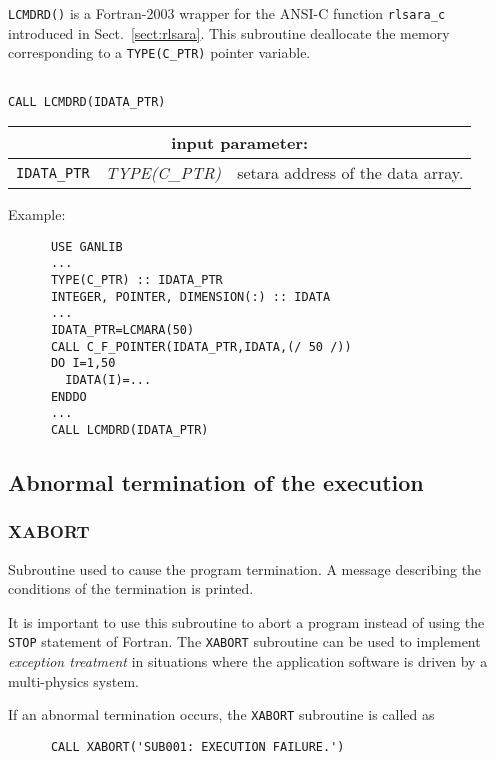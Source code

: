 {\tt LCMDRD()} is a Fortran-2003 wrapper for the ANSI-C function {\tt rlsara\_c} introduced in Sect.~\ref{sect:rlsara}. This subroutine
deallocate the memory corresponding to a {\tt TYPE(C\_PTR)} pointer variable.

\begin{verbatim}

CALL LCMDRD(IDATA_PTR)
\end{verbatim}

\noindent
\begin{tabular}{|p{1.5cm}|p{3cm}|p{10cm}|}
\hline
\multicolumn{3}{|c|}{\bf input parameter:} \\
\hline
{\tt IDATA\_PTR} & {\it TYPE(C\_PTR)} & setara address of the data array. \\
\hline
\end{tabular}

\vskip 0.4cm

\noindent Example:
\begin{verbatim}
      USE GANLIB
      ...
      TYPE(C_PTR) :: IDATA_PTR
      INTEGER, POINTER, DIMENSION(:) :: IDATA
      ...
      IDATA_PTR=LCMARA(50)
      CALL C_F_POINTER(IDATA_PTR,IDATA,(/ 50 /))
      DO I=1,50
        IDATA(I)=...
      ENDDO
      ...
      CALL LCMDRD(IDATA_PTR)
\end{verbatim}

\subsection{Abnormal termination of the execution}

\subsubsection{XABORT}

Subroutine used to cause the program termination. A message describing the conditions of the
termination is printed.

\vskip 0.2cm

It is important to use this subroutine to abort a program instead of using the {\tt STOP}
statement of Fortran. The {\tt XABORT} subroutine can be used to implement {\sl exception
treatment} in situations where the application software is driven by a multi-physics system.

\vskip 0.2cm

If an abnormal termination occurs, the {\tt XABORT} subroutine is called as
\begin{verbatim}
      CALL XABORT('SUB001: EXECUTION FAILURE.')
\end{verbatim}


